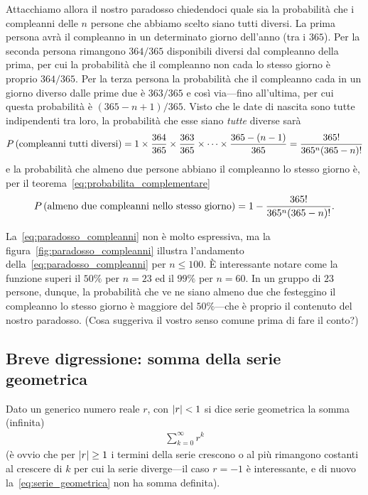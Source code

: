 Attacchiamo allora il nostro paradosso chiedendoci quale sia la probabilità
che i compleanni delle $n$ persone che abbiamo scelto siano tutti diversi.
La prima persona avrà il compleanno in un determinato giorno dell'anno (tra i
$365$). Per la seconda persona rimangono $364/365$ disponibili diversi dal
compleanno della prima, per cui la probabilità che il compleanno non cada lo
stesso giorno è proprio $364/365$. Per la terza persona la probabilità che
il compleanno cada in un giorno diverso dalle prime due è $363/365$ e così
via---fino all'ultima, per cui questa probabilità è $(365 - n + 1)/365$.
Visto che le date di nascita sono tutte indipendenti tra loro, la probabilità
che esse siano \emph{tutte} diverse sarà
\begin{align}
  \displaystyle P\left(\text{compleanni tutti diversi}\right) =
  1 \times \frac{364}{365} \times \frac{363}{365} \times \cdots \times
  \frac{365 - (n - 1)}{365} = \frac{365!}{365^n(365 - n)!}
\end{align}
e la probabilità che almeno due persone abbiano il compleanno lo stesso giorno
è, per il teorema~\eqref{eq:probabilita_complementare}
\begin{align}\label{eq:paradosso_compleanni}
  \displaystyle P\left(\text{almeno due compleanni nello stesso giorno}\right) =
  1 - \frac{365!}{365^n(365 - n)!}.
\end{align}


La~\eqref{eq:paradosso_compleanni} non è molto espressiva, ma la
figura~\ref{fig:paradosso_compleanni} illustra l'andamento
della~\eqref{eq:paradosso_compleanni} per $n \leq 100$. \`E interessante notare
come la funzione superi il $50\%$ per $n = 23$ ed il $99\%$ per $n = 60$.
In un gruppo di $23$ persone, dunque, la probabilità che ve ne siano
almeno due che festeggino il compleanno lo stesso giorno è maggiore del
$50\%$---che è proprio il contenuto del nostro paradosso.
(Cosa suggeriva il vostro senso comune prima di fare il conto?)


\subsection{Breve digressione: somma della serie geometrica}

Dato un generico numero reale $r$, con $\left| r \right| < 1$ si dice serie geometrica
la somma (infinita)
\begin{align}\label{eq:serie_geometrica}
  \sum_{k = 0}^{\infty} r^k
\end{align}
(è ovvio che per $\left| r \right| \geq 1$ i termini della serie crescono o al più
rimangono costanti al crescere di $k$ per cui la serie diverge---il caso
$r = -1$ è interessante, e di nuovo la~\eqref{eq:serie_geometrica} non ha
somma definita).

